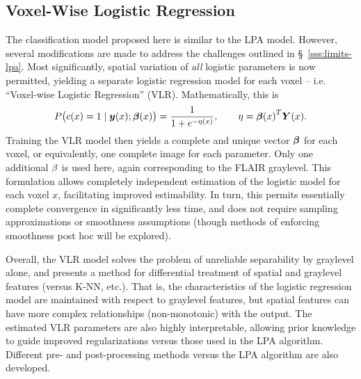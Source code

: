 \subsection{Voxel-Wise Logistic Regression}\label{ss:intro-vlr}
The classification model proposed here is similar to the LPA model.
However, several modifications are made
to address the challenges outlined in \S~\ref{sss:limits-lpa}.
Most significantly, spatial variation of \textit{all} logistic parameters is now permitted,
yielding a separate logistic regression model for each voxel
-- i.e. ``Voxel-wise Logistic Regression'' (VLR).
Mathematically, this is
\begin{equation}
P\big(c(x)=1\mid\by(x);\bb(x)\big) = \frac{1}{1+e^{-\eta(x)}},\qquad\eta = {\bb(x)}^T\bm{Y}(x).%
\label{eq:eq:vlrmodel-intro}
\end{equation}
Training the VLR model then yields a complete and unique vector $\bm{\beta}$ for each voxel,
or equivalently, one complete image for each parameter.
Only one additional $\beta$ is used here, again corresponding to the FLAIR graylevel.
This formulation allows completely independent estimation of the logistic model for each voxel $x$,
facilitating improved estimability.
In turn, this permits essentially complete convergence in significantly less time,
and does not require sampling approximations or smoothness assumptions
(though methods of enforcing smoothness post hoc will be explored).
\par
Overall, the VLR model solves the problem of unreliable separability by graylevel alone,
and presents a method for differential treatment of spatial and graylevel features
(versus K-NN, etc.).
That is, the characteristics of the logistic regression model
are maintained with respect to graylevel features,
but spatial features can have more complex relationships (non-monotonic) with the output.
The estimated VLR parameters are also highly interpretable,
allowing prior knowledge to guide improved regularizations versus those used in the LPA algorithm.
Different pre- and post-processing methods versus the LPA algorithm are also developed.
